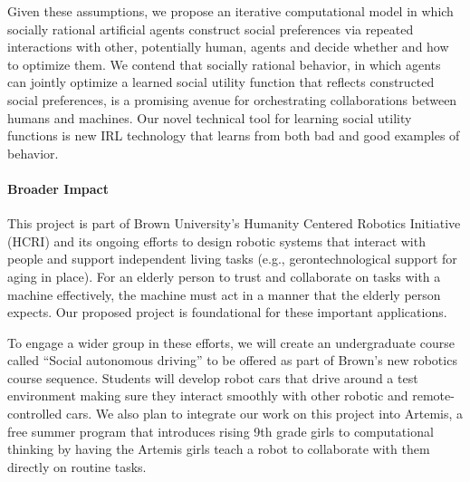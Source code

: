 Given these assumptions, we propose an iterative computational model
in which socially rational artificial agents construct social
preferences via repeated interactions with other, potentially human,
agents and decide whether and how to optimize them.
We contend that socially rational behavior, in which agents
can jointly optimize a learned social utility function that reflects
constructed social preferences, is a promising avenue for
orchestrating collaborations between humans and machines.
%
Our novel technical tool for learning social utility functions is
new IRL technology that learns from
both bad and good examples of behavior.  



\vspace{\up}
\paragraph{Broader Impact}
%
This project is part of Brown University's Humanity Centered
Robotics Initiative (HCRI) and its ongoing efforts to design robotic
systems that interact with people and support independent living tasks
(e.g., gerontechnological support for aging in place).  For an elderly
person to trust and collaborate on tasks with a machine effectively,
the machine must act in a manner that the elderly person expects.  Our
proposed project is foundational for these
important applications.

To engage a wider group in these efforts, 
we will create an undergraduate course called ``Social
autonomous driving'' to be offered as part of Brown's new robotics
course sequence.  Students
will develop robot cars that drive around a test environment making sure they interact smoothly
with other robotic and remote-controlled cars.
We also plan to integrate our work on this project into Artemis, a
free summer program that introduces rising 9th grade girls to
computational thinking by having the Artemis girls
teach a robot to collaborate with them directly on routine tasks.

